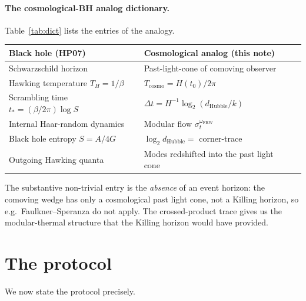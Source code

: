 \documentclass[11pt]{article}
\theoremstyle{definition}
\theoremstyle{remark}
\newcommand{\FRW}{\mathrm{FRW}}
\begin{document}
\paragraph{The cosmological-BH analog dictionary.}
Table~\ref{tab:dict} lists the entries of the analogy.

\begin{center}
\begin{tabular}{lll}
\hline
\textbf{Black hole (HP07)} & \textbf{Cosmological analog (this note)}\\
\hline
Schwarzschild horizon & Past-light-cone of comoving observer\\
Hawking temperature $T_H=1/\beta$ & $T_{\mathrm{cosmo}}=H(t_0)/2\pi$\\
Scrambling time $t_*=(\beta/2\pi)\log S$ & $\Delta t=H^{-1}\log_2(d_{\mathrm{Hubble}}/k)$\\
Internal Haar-random dynamics & Modular flow $\sigma_t^{\omega_\FRW}$\\
Black hole entropy $S=A/4G$ & $\log_2 d_{\mathrm{Hubble}}=$ corner-trace\\
Outgoing Hawking quanta & Modes redshifted into the past light cone\\
\hline
\end{tabular}
\end{center}

\noindent
The substantive non-trivial entry is the \emph{absence} of an event horizon:
the comoving wedge has only a cosmological past light cone, not a
Killing horizon, so e.g.\ Faulkner--Speranza \cite{FaulknerSperanza24}
do not apply. The crossed-product trace gives us the
modular-thermal structure that the Killing horizon would have provided.

\section{The protocol}
\label{sec:protocol}

We now state the protocol precisely.
\end{document}
